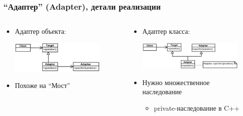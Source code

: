 \documentclass[xetex,mathserif,serif]{beamer}
\begin{document}
	\begin{frame}
		\frametitle{``Адаптер'' (Adapter), детали реализации}
		\begin{columns}
			\begin{column}{0.5\textwidth}
				\begin{itemize}
					\item Адаптер объекта:
						\vspace{0.3cm}
						
						\includegraphics[width=0.8\textwidth]{objectAdapter.png}
						\vspace{0.3cm}
					\item Похоже на ``Мост''
				\end{itemize}
			\end{column}
			\begin{column}{0.5\textwidth}
				\begin{itemize}
					\item Адаптер класса:
						\vspace{0.3cm}
						
						\includegraphics[width=0.9\textwidth]{classAdapter.png}
						\vspace{0.3cm}
					\item Нужно множественное наследование
					\begin{itemize}
						\item private-наследование в C++
					\end{itemize}
				\end{itemize}
			\end{column}
		\end{columns}
	\end{frame}
\end{document}
